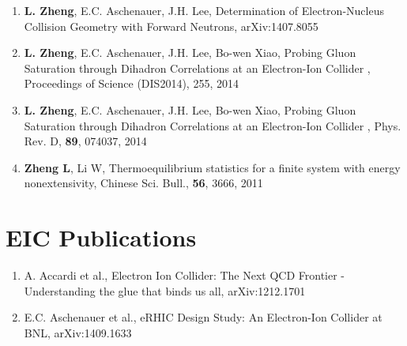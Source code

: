 \begin{enumerate}

\item \textbf{L. Zheng}, E.C. Aschenauer, J.H. Lee, Determination of Electron-Nucleus Collision Geometry with Forward Neutrons,
  arXiv:1407.8055

\item \textbf{L. Zheng}, E.C. Aschenauer, J.H. Lee, Bo-wen Xiao, Probing Gluon Saturation through Dihadron Correlations at an Electron-Ion Collider ,
  Proceedings of Science (DIS2014), 255, 2014
  
\item \textbf{L. Zheng}, E.C. Aschenauer, J.H. Lee, Bo-wen Xiao, Probing Gluon Saturation through Dihadron Correlations at an Electron-Ion Collider ,
 Phys. Rev. D, \textbf{89}, 074037, 2014
 
\item \textbf{Zheng L}, Li W, Thermoequilibrium statistics for a finite system with energy nonextensivity,
Chinese Sci. Bull., \textbf{56}, 3666, 2011
  
%  
%
%

\end{enumerate}


\section*{EIC Publications}
\begin{enumerate}
\item A. Accardi et al., Electron Ion Collider: The Next QCD Frontier - Understanding the glue that binds us all,
 arXiv:1212.1701
 
\item E.C. Aschenauer et al., eRHIC Design Study: An Electron-Ion Collider at BNL, arXiv:1409.1633
%
% 

\end{enumerate}


